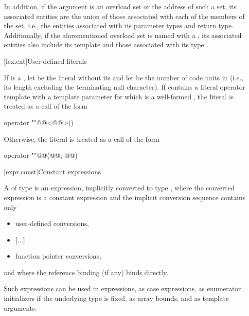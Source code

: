\documentclass{wg21}
\begin{document}
In addition, if the argument is an overload set or the address of such a set,
its associated entities
are the union of those associated with each of the
members of the set, i.e., the entities associated with its
parameter types and return type.
Additionally, if the aforementioned overload set is named with
a , its associated entities also include
its  template  and
those associated with its type .

[lex.ext]{User-defined literals}

\pnum
If  is a ,
let  be the literal without its 
and let  be the number of code units in 
(i.e., its length excluding the terminating null character).
If  contains a literal operator template with
a  template parameter for which  is
a well-formed ,
the literal  is treated as a call of the form
\begin{codeblock}
    operator ""@@<@@>()
\end{codeblock}
Otherwise, the literal  is treated as a call of the form
\begin{codeblock}
    operator ""@@(@@, @@)
\end{codeblock}

[expr.const]{Constant expressions}%

\pnum
A 
of type  is an
expression, implicitly converted to type , where
the converted expression is a constant expression and the
implicit conversion sequence contains only
\begin{itemize}
    \item user-defined conversions,
    \item \textcolor{noteclr}{[...]}
    \item function pointer conversions,
\end{itemize}
and where the reference binding (if any) binds directly.
\begin{note}
    Such expressions can be used in 
    expressions, as case expressions,
    as enumerator initializers if the underlying type is
    fixed, as array bounds, and
    as  template
    arguments.
\end{note}
\end{document}
